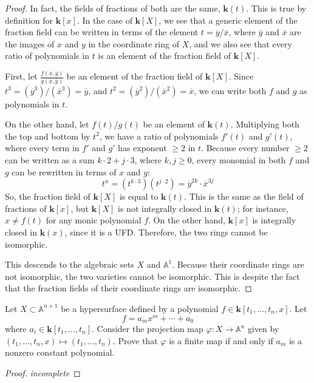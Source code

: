 \documentclass[12pt]{article}
\theoremstyle{definition}
\newenvironment{problem}[2][Problem]{\begin{trivlist}
\item[\hskip \labelsep {\bfseries #1}\hskip \labelsep {\bfseries #2.}]}{\end{trivlist}}
\begin{document}
\begin{problem}{5}
\begin{proof}
	\par In fact, the fields of fractions of both are the same, $\mathbf k(t)$. This is true by definition for $ \mathbf{k}[x]$. In the case of $\mathbf k[X]$, we see that a generic element of the fraction field can be written in terms of the element $t = \overline y / \overline x$, where $\overline y$ and $\overline x$ are the images of $x$ and $y$ in the coordinate ring of $X$, and we also see that every ratio of polynomials in $t$ is an element of the fraction field of $\mathbf k[X]$.
	\par First, let $\frac{f(\overline x,\overline y)}{g(\overline x,\overline y)}$ be an element of the fraction field of $\mathbf k[X]$. Since $t^3 = (\overline y^3) / (\overline x^3) = \overline y$, and $t^2 = (\overline y^2 )/(\overline x^2) = \overline x$, we can write both $f$ and $g$ as polynomials in $t$. 
	\par On the other hand, let $f(t)/g(t)$ be an element of $\mathbf{k}(t)$. Multiplying both the top and bottom by $t^2$, we have a ratio of polynomials $f'(t)$ and $g'(t)$, where every term in $f'$ and $g'$ has exponent $\geq 2$ in $t$. Because every number $\geq 2$ can be written as a sum $k \cdot 2 + j \cdot 3$, where $k, j \geq 0$, every monomial in both $f $ and $g$ can be rewritten in terms of $x$ and $y$:
	\[t^n = (t^{k \cdot 3})(t^{j \cdot 2}) = \overline y^{2k} \cdot \overline x^{3j}\]
	So, the fraction field of $\mathbf k[X]$ is equal to $\mathbf k(t)$. This is the same as the field of fractions of $\mathbf k[x]$, but $\mathbf k[X]$ is not integrally closed in $\mathbf k(t)$; for instance, $x \neq f(t)$ for any monic polynomial $f$. On the other hand, $ \mathbf k[x]$ is integrally closed in $\mathbf k(x)$, since it is a UFD. Therefore, the two rings cannot be isomorphic. 
	\par This descends to the algebraic sets $X$ and $\mathbb A^1$. Because their coordinate rings are not isomorphic, the two varieties cannot be isomorphic. This is despite the fact that the fraction fields of their coordinate rings are isomorphic.
\end{proof}
\end{problem}
\begin{problem}{6}
Let $X \subset \mathbb A^{n+1}$ be a hypersurface defined by a polynomial $f \in \mathbf k[t_1, \dots , t_n, x]$. Let 
\[
f = a_mx^m + \cdots + a_0 
\]
where $a_i \in \mathbf{k} [t_1, \dots, t_n]$. Consider the projection map $\varphi : X \to \mathbb A^n$ given by $(t_1, \dots, t_n, x) \mapsto (t_1, \dots, t_n)$. Prove that $\varphi$ is a finite map if and only if $a_m$ is a nonzero constant polynomial.
\begin{proof}
	\textit{incomplete}
\end{proof}
\end{problem}
\end{document}
